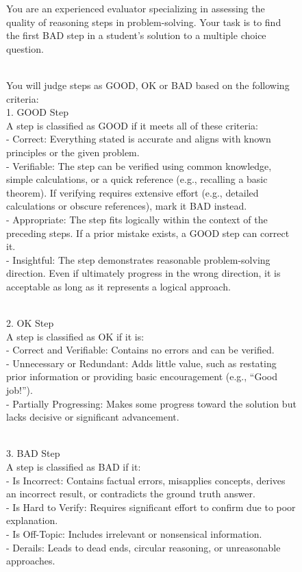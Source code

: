 \begin{figure}[ht]
    \centering
    \begin{minipage}{6in}
    \begin{tcolorbox}[width=6in, sharp corners=all, colback=white!95!black]

You are an experienced evaluator specializing in assessing the quality of reasoning steps in problem-solving. Your task is to find the first BAD step in a student's solution to a multiple choice question.

\-\\
You will judge steps as GOOD, OK or BAD based on the following criteria:\\
1. GOOD Step\\
A step is classified as GOOD if it meets all of these criteria:\\
- Correct: Everything stated is accurate and aligns with known principles or the given problem.\\
- Verifiable: The step can be verified using common knowledge, simple calculations, or a quick reference (e.g., recalling a basic theorem). If verifying requires extensive effort (e.g., detailed calculations or obscure references), mark it BAD instead.\\
- Appropriate: The step fits logically within the context of the preceding steps. If a prior mistake exists, a GOOD step can correct it.\\
- Insightful: The step demonstrates reasonable problem-solving direction. Even if ultimately progress in the wrong direction, it is acceptable as long as it represents a logical approach.

\-\\
2. OK Step\\
A step is classified as OK if it is:\\
- Correct and Verifiable: Contains no errors and can be verified.\\
- Unnecessary or Redundant: Adds little value, such as restating prior information or providing basic encouragement (e.g., “Good job!”).\\
- Partially Progressing: Makes some progress toward the solution but lacks decisive or significant advancement.

\-\\
3. BAD Step\\
A step is classified as BAD if it:\\
- Is Incorrect: Contains factual errors, misapplies concepts, derives an incorrect result, or contradicts the ground truth answer.\\
- Is Hard to Verify: Requires significant effort to confirm due to poor explanation.\\
- Is Off-Topic: Includes irrelevant or nonsensical information.\\
- Derails: Leads to dead ends, circular reasoning, or unreasonable approaches.


\end{tcolorbox}
\end{minipage}
\end{figure}
